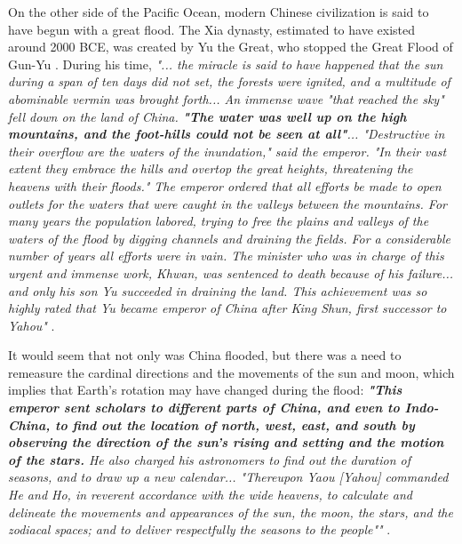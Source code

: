 \documentclass[10pt,twocolumn,letterpaper]{article}
\begin{document}
On the other side of the Pacific Ocean, modern Chinese civilization is said to have begun with a great flood. The Xia dynasty, estimated to have existed around 2000 BCE, was created by Yu the Great, who stopped the Great Flood of Gun-Yu \cite{6}. During his time, \textit{"... the miracle is said to have happened that the sun during a span of ten days did not set, the forests were ignited, and a multitude of abominable vermin was brought forth... An immense wave "that reached the sky" fell down on the land of China. \textbf{"The water was well up on the high mountains, and the foot-hills could not be seen at all"}... "Destructive in their overflow are the waters of the inundation," said the emperor. "In their vast extent they embrace the hills and overtop the great heights, threatening the heavens with their floods." The emperor ordered that all efforts be made to open outlets for the waters that were caught in the valleys between the mountains. For many years the population labored, trying to free the plains and valleys of the waters of the flood by digging channels and draining the fields. For a considerable number of years all efforts were in vain. The minister who was in charge of this urgent and immense work, Khwan, was sentenced to death because of his failure... and only his son Yu succeeded in draining the land. This achievement was so highly rated that Yu became emperor of China after King Shun, first successor to Yahou"} \cite{5}.

It would seem that not only was China flooded, but there was a need to remeasure the cardinal directions and the movements of the sun and moon, which implies that Earth's rotation may have changed during the flood: \textit{\textbf{"This emperor sent scholars to different parts of China, and even to Indo-China, to find out the location of north, west, east, and south by observing the direction of the sun's rising and setting and the motion of the stars.} He also charged his astronomers to find out the duration of seasons, and to draw up a new calendar... "Thereupon Yaou [Yahou] commanded He and Ho, in reverent accordance with the wide heavens, to calculate and delineate the movements and appearances of the sun, the moon, the stars, and the zodiacal spaces; and to deliver respectfully the seasons to the people""} \cite{5}.
\end{document}
